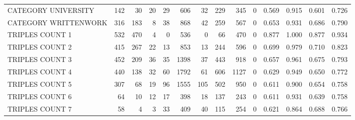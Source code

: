 \begin{tabular}{lrrrrrrrrrllll}
 CATEGORY UNIVERSITY      &             142 &            30 &              20 &              29 &             606 &   32 &  229 &  345 &    0 & 0.569 & 0.915 & 0.601 & 0.726 \\
 CATEGORY WRITTENWORK     &             316 &           183 &               8 &              38 &             868 &   42 &  259 &  567 &    0 & 0.653 & 0.931 & 0.686 & 0.790 \\
 TRIPLES COUNT 1          &             532 &           470 &               4 &               0 &             536 &    0 &   66 &  470 &    0 & 0.877 & 1.000 & 0.877 & 0.934 \\
 TRIPLES COUNT 2          &             415 &           267 &              22 &              13 &             853 &   13 &  244 &  596 &    0 & 0.699 & 0.979 & 0.710 & 0.823 \\
 TRIPLES COUNT 3          &             452 &           209 &              36 &              35 &            1398 &   37 &  443 &  918 &    0 & 0.657 & 0.961 & 0.675 & 0.793 \\
 TRIPLES COUNT 4          &             440 &           138 &              32 &              60 &            1792 &   61 &  606 & 1127 &    0 & 0.629 & 0.949 & 0.650 & 0.772 \\
 TRIPLES COUNT 5          &             307 &            68 &              19 &              96 &            1555 &  105 &  502 &  950 &    0 & 0.611 & 0.900 & 0.654 & 0.758 \\
 TRIPLES COUNT 6          &              64 &            10 &              12 &              17 &             398 &   18 &  137 &  243 &    0 & 0.611 & 0.931 & 0.639 & 0.758 \\
 TRIPLES COUNT 7          &              58 &             4 &               3 &              33 &             409 &   40 &  115 &  254 &    0 & 0.621 & 0.864 & 0.688 & 0.766 \\
\hline
\end{tabular}